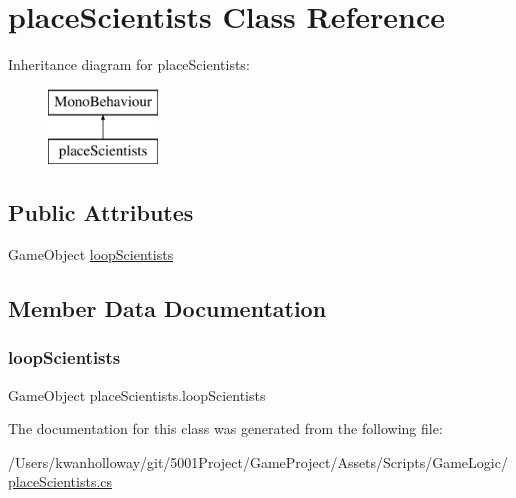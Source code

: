 \hypertarget{classplace_scientists}{}\section{place\+Scientists Class Reference}
\label{classplace_scientists}
Inheritance diagram for place\+Scientists\+:\begin{figure}[H]
\begin{center}
\leavevmode
\includegraphics[height=2.000000cm]{classplace_scientists}
\end{center}
\end{figure}
\subsection*{Public Attributes}
\begin{DoxyCompactItemize}
\item 
Game\+Object \hyperlink{classplace_scientists_a5ced1e88492dd766534202679f8e0fd4}{loop\+Scientists}
\end{DoxyCompactItemize}


\subsection{Member Data Documentation}
\mbox{\label{classplace_scientists_a5ced1e88492dd766534202679f8e0fd4}} 
\subsubsection{\texorpdfstring{loop\+Scientists}{loopScientists}}
{\footnotesize\ttfamily Game\+Object place\+Scientists.\+loop\+Scientists}



The documentation for this class was generated from the following file\+:\begin{DoxyCompactItemize}
\item 
/\+Users/kwanholloway/git/5001\+Project/\+Game\+Project/\+Assets/\+Scripts/\+Game\+Logic/\hyperlink{place_scientists_8cs}{place\+Scientists.\+cs}\end{DoxyCompactItemize}
